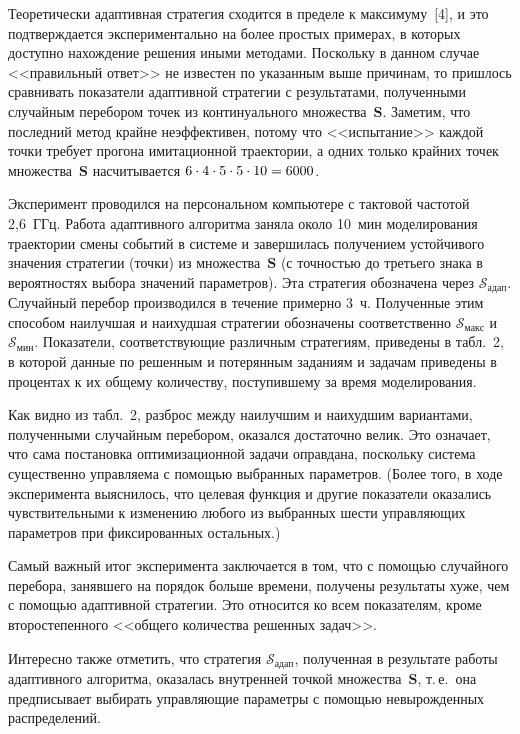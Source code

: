 \begin{multicols}{2}
    Теоретически адаптивная стратегия сходится в пределе к 
максимуму~[4], и это подтверждается экспериментально на более простых 
примерах, в которых доступно нахождение решения иными методами. 
Поскольку в данном случае <<правильный ответ>> не известен по 
указанным выше причинам, то пришлось сравнивать показатели 
адаптивной стратегии с результатами, полученными случайным перебором 
точек из континуального множества~$\mathbf{S}$. Заметим, что последний 
метод крайне неэффективен, потому что <<испытание>> каждой точки 
требует прогона имитационной траектории, а одних только крайних точек 
множества~$\mathbf{S}$ насчитывается $6\cdot 4\cdot 5\cdot 5\cdot 10 
\hm= 6000$.
    
    Эксперимент проводился на персональном компьютере с тактовой 
частотой 2,6~ГГц. Работа адаптив\-но\-го алгоритма заняла около 10~мин 
моделирования траектории смены событий в системе и завершилась 
получением устойчивого значения стратегии (точки) из 
множества~$\mathbf{S}$ (с точностью до третьего знака в вероятностях 
выбора значений параметров). Эта стратегия обозначена через 
$\mathcal{S}_{\mathrm{адап}}$. Случайный перебор производился в течение примерно 
3~ч. Полученные этим способом наилучшая и наихудшая стратегии 
обозначены соответственно $\mathcal{S}_{\mathrm{макс}}$ 
и~$\mathcal{S}_{\mathrm{мин}}$. Показатели, 
соответствующие различным стратегиям, приведены в табл.~2, в которой 
данные по решенным и потерянным заданиям и задачам приведены в 
процентах к их общему количеству, поступившему за время моделирования.
    

    
    Как видно из табл.~2, разброс между наилучшим  и наихудшим  
вариантами, полученными случайным перебором, оказался достаточно 
велик. Это означает, что сама постановка оптимизационной задачи 
оправдана, поскольку система существенно управляема с помощью 
выбранных параметров. (Более того, в ходе эксперимента выяснилось, что 
целевая функция и другие показатели оказались чувствительными к 
изменению любого из выбранных шести управляющих параметров при 
фиксированных остальных.)
    
    Самый важный итог эксперимента заключается в том, что с помощью 
случайного перебора, занявшего на порядок больше времени, получены 
результаты хуже, чем с помощью адаптивной стратегии. Это относится ко 
всем показателям, кроме второстепенного <<общего количества решенных 
задач>>.
    
    Интересно также отметить, что стратегия $\mathcal{S}_{\mathrm{адап}}$, 
полученная в результате работы адаптивного алгоритма, оказалась 
внутренней точкой множества~$\mathbf{S}$, т.\,е.\ она предписывает 
выбирать управляющие параметры с помощью невырожденных 
распределений.


\end{multicols}
